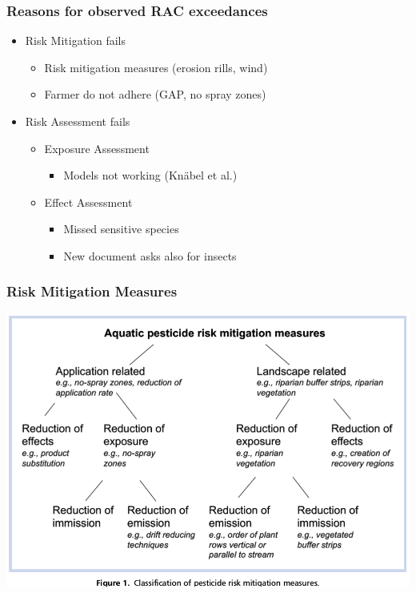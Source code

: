 \documentclass[
	10pt
	]{beamer}
\begin{document}
\begin{frame}
\frametitle{Reasons for observed RAC exceedances}
	\begin{itemize}
		\item Risk Mitigation fails
			\begin{itemize}
				\item Risk mitigation measures (erosion rills, wind)
				\item Farmer do not adhere (GAP, no spray zones)
			\end{itemize}
		\item Risk Assessment fails
			\begin{itemize}
				\item Exposure Assessment
					\begin{itemize}
						\item Models not working (Knäbel et al.)
					\end{itemize}
				\item Effect Assessment
					\begin{itemize}
						\item Missed sensitive species
						\item New document asks also for insects
					\end{itemize}
			\end{itemize}

	\end{itemize}
\end{frame}


{%
\begin{frame}
\frametitle{Risk Mitigation Measures}
	    	    	\includegraphics[height=0.8\textheight]{figs/bereswill_2014_fig1.png}
\end{frame}
}
\end{document}
